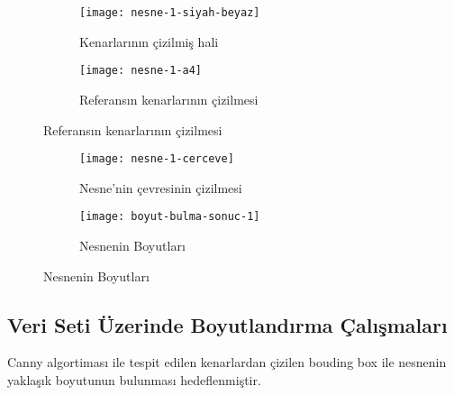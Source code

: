 \documentclass[11pt,a4paper]{report}
\begin{document}
\begin{justify}
\begin{figure}[!h]
\end{figure}
	


\begin{landscape} %
	
	
\begin{figure}[!h] %
		\centering
		
		\begin{subfigure}[t]{0.4\linewidth}
			\centering
			\texttt{[image: nesne-1-siyah-beyaz]}
			\caption{Kenarlarının çizilmiş hali}
		\end{subfigure}\hfill
		\begin{subfigure}[t]{0.47\linewidth}
			\centering
			\texttt{[image: nesne-1-a4]}
			\caption{Referansın kenarlarının çizilmesi}
		\end{subfigure}
\end{figure}
	
\end{landscape}

\begin{landscape} %
	
	
	\begin{figure}[!h] %
		\centering
		
		\begin{subfigure}[t]{0.470\linewidth}
			\centering
			\texttt{[image: nesne-1-cerceve]}
			\caption{Nesne'nin çevresinin çizilmesi}
		\end{subfigure}\hfill
		\begin{subfigure}[t]{0.49\linewidth}
			\centering
			\texttt{[image: boyut-bulma-sonuc-1]}
			\caption{Nesnenin Boyutları}
		\end{subfigure}
		
	\end{figure}
	
     \end{landscape}
     
  \subsection{Veri Seti Üzerinde Boyutlandırma Çalışmaları}
  Canny algortiması ile tespit edilen kenarlardan çizilen bouding box ile nesnenin yaklaşık boyutunun bulunması hedeflenmiştir.
 \vspace{0.2cm}

  	\begin{figure} [!h]
  		\centering
  	

\end{figure}
\end{justify}
\end{document}
